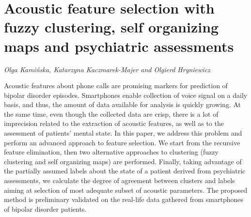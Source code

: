 \documentclass[../booklet.tex]{subfiles}
\begin{document}
\section[Acoustic feature selection with fuzzy clustering, self organizing maps and psychiatric assessments. {\it Olga Kamińska, Katarzyna Kaczmarek-Majer and Olgierd Hryniewicz}]{Acoustic feature selection with fuzzy clustering, self organizing maps and psychiatric assessments}
  

\begin{center}
  {\it Olga Kamińska, Katarzyna Kaczmarek-Majer and Olgierd Hryniewicz}
\end{center}

\vskip 0.8cm




Acoustic features about phone calls are promising markers for prediction of bipolar disorder episodes. Smartphones enable collection of voice signal on a daily basis, and thus, the amount of data available for analysis is quickly growing. At the same time, even though the collected data are crisp, there is a lot of imprecision related to the extraction of acoustic features, as well as to the assessment of patients' mental state. In this paper, we address this problem and perform an advanced approach to feature selection. We start from the recursive feature elimination, then two alternative approaches to clustering (fuzzy clustering and self organizing maps) are performed.
Finally, taking advantage of the partially assumed labels about the state of a patient derived from psychiatric assessments, we calculate the degree of agreement between clusters and labels aiming at selection of most adequate subset of acoustic parameters. The proposed method is preliminary validated on the real-life data gathered from smartphones of bipolar disorder patients.

\end{document}
